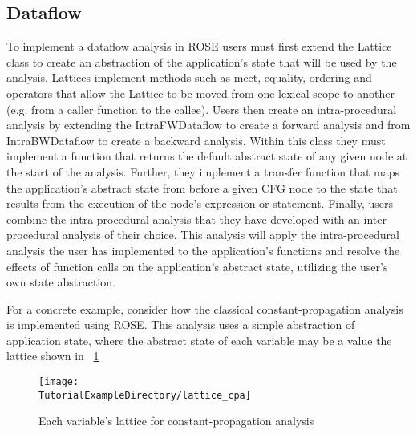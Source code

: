 {\subsection{Dataflow}
To implement a dataflow analysis in ROSE users must first extend the {\scriptsize Lattice} class to create an abstraction of the application’s state that will be used by the analysis. {\scriptsize Lattices} implement methods such as meet, equality, ordering and operators that allow the {\scriptsize Lattice} to be moved from one lexical scope to another (e.g. from a caller function to the callee). Users then create an intra-procedural analysis by extending the {\scriptsize IntraFWDataflow} to create a forward analysis and from {\scriptsize IntraBWDataflow} to create a backward analysis. Within this class they must implement a function that returns the default abstract state of any given node at the start of the analysis. Further, they implement a {\scriptsize transfer} function that maps the application’s abstract state from before a given CFG node to the state that results from the execution of the node’s expression or statement. Finally, users combine the intra-procedural analysis that they have developed with an inter-procedural analysis of their choice. This analysis will apply the intra-procedural analysis the user has implemented to the application’s functions and resolve the effects of function calls on the application’s abstract state, utilizing the user’s own state abstraction.

For a concrete example, consider how the classical constant-propagation analysis is implemented using ROSE. This analysis uses a simple abstraction of application state, where the abstract state of each variable may be a value the lattice shown in ~\ref{lattice_cpa}

\begin{figure}
\texttt{[image: \\TutorialExampleDirectory/lattice\_cpa]}
\caption{Each variable's lattice for constant-propagation analysis}
\label{lattice_cpa}
\end{figure}

}
